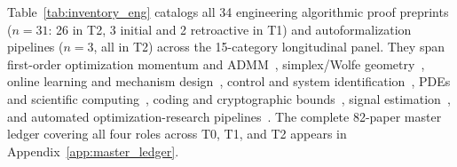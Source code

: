 \documentclass[11pt,letterpaper]{article}
\begin{document}
Table~\ref{tab:inventory_eng} catalogs all 34 engineering algorithmic proof preprints ($n = 31$: 26 in T2, 3 initial and 2 retroactive in T1) and autoformalization pipelines ($n = 3$, all in T2) across the 15-category longitudinal panel. They span first-order optimization momentum and ADMM~\cite{arxiv2611_13584,arxiv2611_09169,arxiv2605_09552}, simplex/Wolfe geometry~\cite{arxiv2611_12680}, online learning and mechanism design~\cite{arxiv2611_05243,arxiv2611_09615,arxiv2611_14586,arxiv2611_04545}, control and system identification~\cite{arxiv2611_18220,arxiv2611_10902,arxiv2611_16781,arxiv2611_26140,arxiv2611_14756}, PDEs and scientific computing~\cite{arxiv2611_11805,arxiv2611_12585,arxiv2611_18455,arxiv2611_07395,arxiv2611_20131}, coding and cryptographic bounds~\cite{arxiv2611_15128,arxiv2611_11713,arxiv2611_14475,arxiv2611_04876,arxiv2611_22732,arxiv2611_23762,arxiv2605_02856}, signal estimation~\cite{arxiv2605_14610}, and automated optimization-research pipelines~\cite{arxiv2611_13872,arxiv2611_23080,arxiv2611_26272}. The complete 82-paper master ledger covering all four roles across T0, T1, and T2 appears in Appendix~\ref{app:master_ledger}.
\end{document}
